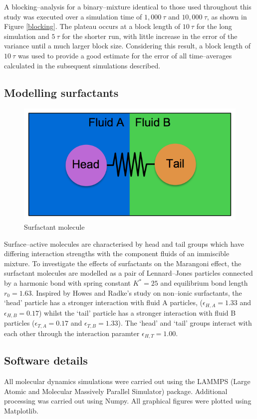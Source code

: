 \FloatBarrier
A blocking--analysis for a binary--mixture identical to those used throughout this study was executed over a simulation time of $1,000\ \tau$ and $10,000\ \tau$, as shown in Figure \ref{blocking}.
The plateau occurs at a block length of $10\ \tau$ for the long simulation and $5\ \tau$ for the shorter run, with little increase in the error of the variance until a much larger block size.
Considering this result, a block length of $10\ \tau$ was used to provide a good estimate for the error of all time--averages calculated in the subsequent simulations described.

\subsection{Modelling surfactants}
\begin{figure}[h]
\centering
\includegraphics[scale=0.4]{surfactant.png}
\caption{Surfactant molecule}
\label{surfactant}
\end{figure}
\FloatBarrier
Surface--active molecules are characterised by head and tail groups which have differing interaction strengths with the component fluids of an immiscible mixture.
To investigate the effects of surfactants on the Marangoni effect, the surfactant molecules are modelled as a pair of Lennard--Jones particles connected by a harmonic bond with spring constant $K^{*} = 25$ and equilibrium bond length $r_{0}=1.63$.
Inspired by Howes and Radke's study on non--ionic surfactants,\cite{HowesSurfactant} the `head' particle has a stronger interaction with fluid A particles, ($\epsilon_{H, A} = 1.33$ and $\epsilon_{H, B} = 0.17$) whilst the `tail' particle has a stronger interaction with fluid B particles ($\epsilon_{T, A} = 0.17$ and $\epsilon_{T, B} = 1.33$).
The `head' and `tail' groups interact with each other through the interaction paramter $\epsilon_{H, T} = 1.00$.

\subsection{Software details}
All molecular dynamics simulations were carried out using the LAMMPS (Large Atomic and Molecular Massively Parallel Simulator) package.\cite{LAMMPS}
Additional processing was carried out using Numpy.\cite{NumPy}
All graphical figures were plotted using Matplotlib.\cite{MatPlotLib}

